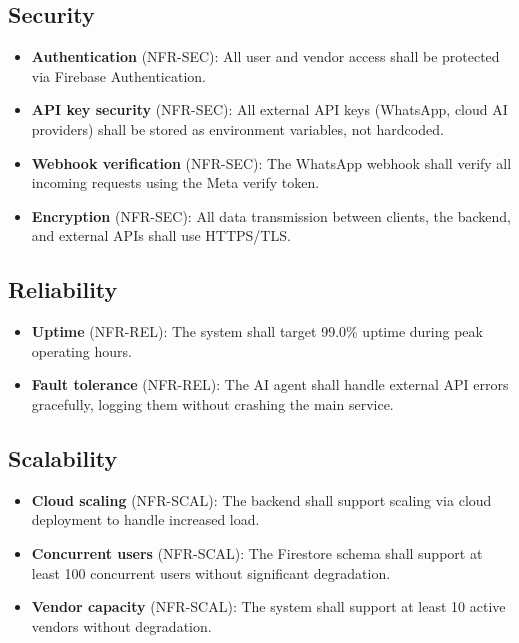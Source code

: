 \subsection{Security}
\begin{itemize}
  \item \textbf{Authentication} (NFR-SEC): All user and vendor access shall be protected via Firebase Authentication.
  \item \textbf{API key security} (NFR-SEC): All external API keys (WhatsApp, cloud AI providers) shall be stored as environment variables, not hardcoded.
  \item \textbf{Webhook verification} (NFR-SEC): The WhatsApp webhook shall verify all incoming requests using the Meta verify token.
  \item \textbf{Encryption} (NFR-SEC): All data transmission between clients, the backend, and external APIs shall use HTTPS/TLS.
\end{itemize}

\subsection{Reliability}
\begin{itemize}
  \item \textbf{Uptime} (NFR-REL): The system shall target 99.0\% uptime during peak operating hours.
  \item \textbf{Fault tolerance} (NFR-REL): The AI agent shall handle external API errors gracefully, logging them without crashing the main service.
\end{itemize}

\subsection{Scalability}
\begin{itemize}
  \item \textbf{Cloud scaling} (NFR-SCAL): The backend shall support scaling via cloud deployment to handle increased load.
  \item \textbf{Concurrent users} (NFR-SCAL): The Firestore schema shall support at least 100 concurrent users without significant degradation.
  \item \textbf{Vendor capacity} (NFR-SCAL): The system shall support at least 10 active vendors without degradation.
\end{itemize}

